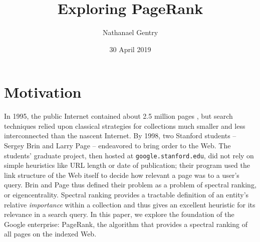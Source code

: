 \documentclass[12pt]{article}
\title{Exploring PageRank}
\author{Nathanael Gentry}
\date{30 April 2019}
\begin{document}
\maketitle



\section{Motivation}
In 1995, the public Internet contained about 2.5 million pages
\cite{TotalNumberWebsites}, but search techniques relied upon classical
strategies for collections much smaller and less interconnected than the nascent
Internet. By 1998, two Stanford students -- Sergey Brin and Larry Page --
endeavored to bring order to the Web. The students’ graduate project, then hosted at
\texttt{google.stanford.edu}, did not rely on simple heuristics like URL length
or date of publication; their program used the link structure of the Web itself
to decide how relevant a page was to a user's query. Brin and Page thus defined
their problem as a problem of spectral ranking, or eigencentrality. Spectral
ranking provides a tractable definition of an entity's relative
\textit{importance} within a collection and thus gives an excellent heuristic
for its relevance in a search query. In this paper, we explore the foundation of
the Google enterprise: PageRank, the algorithm that provides a spectral ranking
of all pages on the indexed Web.
\end{document}

